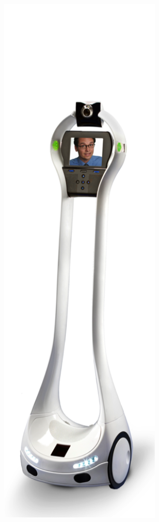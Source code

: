\begin{figure}[ht]
   \begin{minipage}[b]{.25\linewidth} 
      \centering 
      \includegraphics[width=0.7\textwidth]{bilder/grundlagen/1.png} 

\end{minipage}
\end{figure}
